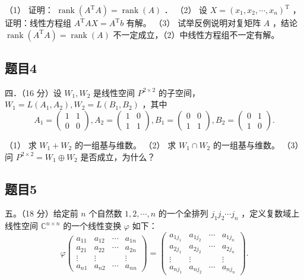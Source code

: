 \documentclass{article}
\begin{document}
（1） 证明： \(\operatorname{rank}\left(A^{\mathrm{T}} A\right)=\operatorname{rank}(A)\) ．
（2） 设 \(X=\left(x_{1}, x_{2}, \cdots, x_{n}\right)^{\mathrm{T}}\) ，证明：线性方程组 \(A^{\mathrm{T}} A X=A^{\mathrm{T}} b\) 有解。
（3） 试举反例说明对复矩阵 \(A\) ，结论 \(\operatorname{rank}\left(A^{\mathrm{T}} A\right)=\operatorname{rank}(A)\) 不一定成立，（2）中线性方程组不一定有解。

\subsection{题目4}
四．（16 分）设 \(W_{1}, W_{2}\) 是线性空间 \(P^{2 \times 2}\) 的子空间，\(W_{1}=L\left(A_{1}, A_{2}\right), W_{2}=L\left(B_{1}, B_{2}\right)\) ，其中
\[
A_{1}=\left(\begin{array}{ll}
1 & 1 \\
0 & 0
\end{array}\right), A_{2}=\left(\begin{array}{ll}
1 & 0 \\
1 & 1
\end{array}\right), B_{1}=\left(\begin{array}{ll}
0 & 0 \\
1 & 1
\end{array}\right), B_{2}=\left(\begin{array}{ll}
0 & 1 \\
1 & 0
\end{array}\right) .
\]

（1） 求 \(W_{1}+W_{2}\) 的一组基与维数。
（2） 求 \(W_{1} \cap W_{2}\) 的一组基与维数。
（3） 问 \(P^{2 \times 2}=W_{1} \oplus W_{2}\) 是否成立，为什么？

\subsection{题目5}
五。（18 分）给定前 \(n\) 个自然数 \(1,2, \cdots, n\) 的一个全排列 \(j_{1} j_{2} \cdots j_{n}\) ，定义复数域上线性空间 \(\mathbb{C}^{n \times n}\) 的一个线性变换 \(\varphi\) 如下：
\[
\varphi\left(\begin{array}{cccc}
a_{11} & a_{12} & \cdots & a_{1 n} \\
a_{21} & a_{22} & \cdots & a_{2 n} \\
\vdots & \vdots & & \vdots \\
a_{n 1} & a_{n 2} & \cdots & a_{n n}
\end{array}\right)=\left(\begin{array}{cccc}
a_{1 j_{1}} & a_{1 j_{2}} & \cdots & a_{1 j_{n}} \\
a_{2 j_{1}} & a_{2 j_{2}} & \cdots & a_{2 j_{n}} \\
\vdots & \vdots & & \vdots \\
a_{n j_{1}} & a_{n j_{2}} & \cdots & a_{n j_{n}}
\end{array}\right) .
\]
\end{document}
